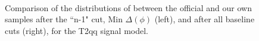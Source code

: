 \begin{figure}
        \centering
        \hspace{-1 cm}
        ~ %
        \caption{Comparison of the distributions of \MHT between the official and our own samples after the ``n-1" cut, Min $\Delta(\phi)$ (left), and after all baseline cuts (right), for the T2qq signal model.}\label{fig:animals}
\end{figure}        
        
